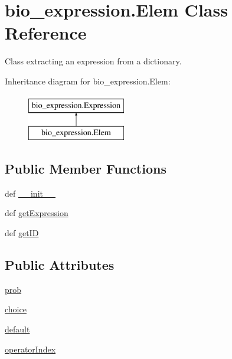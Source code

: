 \hypertarget{classbio__expression_1_1_elem}{\section{bio\+\_\+expression.\+Elem Class Reference}
\label{classbio__expression_1_1_elem}
}


Class extracting an expression from a dictionary.  


Inheritance diagram for bio\+\_\+expression.\+Elem\+:\begin{figure}[H]
\begin{center}
\leavevmode
\includegraphics[height=2.000000cm]{d6/d21/classbio__expression_1_1_elem}
\end{center}
\end{figure}
\subsection*{Public Member Functions}
\begin{DoxyCompactItemize}
\item 
def \hyperlink{classbio__expression_1_1_elem_a364649cdfb339e7177200501136b4a3b}{\+\_\+\+\_\+init\+\_\+\+\_\+}
\item 
def \hyperlink{classbio__expression_1_1_elem_a2733a5fe40635709324de8507de2ca5a}{get\+Expression}
\item 
def \hyperlink{classbio__expression_1_1_elem_a2a48374c8093b87d30c09222c14a8708}{get\+I\+D}
\end{DoxyCompactItemize}
\subsection*{Public Attributes}
\begin{DoxyCompactItemize}
\item 
\hyperlink{classbio__expression_1_1_elem_a17c61b7da60297dbf7f4164a2a78aa49}{prob}
\item 
\hyperlink{classbio__expression_1_1_elem_a024d48dfc32b4486db3e0147bb57f2cf}{choice}
\item 
\hyperlink{classbio__expression_1_1_elem_ae9652f5b42921e03b8623baf034e01be}{default}
\item 
\hyperlink{classbio__expression_1_1_elem_a862e4fd7b70af8a2bd3c0db048dc90a5}{operator\+Index}
\end{DoxyCompactItemize}


